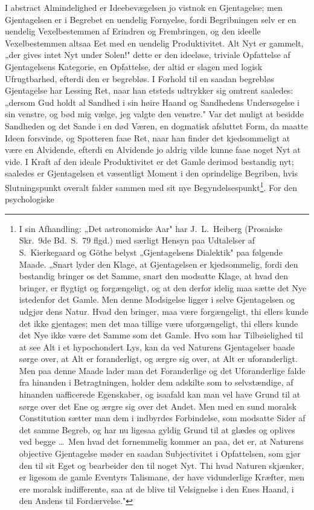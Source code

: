 \documentclass[12pt]{book}
\newcommand{\opage}[1]{\marginnote{\footnotesize\textit{[#1]}}}
\begin{document}
I abstract Almindelighed er Ideebevægelsen jo vistnok en Gjentagelse; men Gjentagelsen er i
Begrebet en uendelig Fornyelse, fordi Begribningen selv er en uendelig Vexelbestemmen af Erindren
og Frembringen, og den ideelle Vexelbestemmen altsaa Eet med en uendelig Produktivitet. Alt Nyt
er gammelt, „der gives intet Nyt under Solen!" dette er den ideeløse, triviale Opfattelse af
Gjentagelsens Kategorie, en Opfattelse, der altid er slagen med logisk Ufrugtbarhed, efterdi den
er begrebløs. I Forhold til en saadan begrebløs Gjentagelse har Lessing Ret, naar han etsteds
udtrykker sig omtrent saaledes: „dersom Gud holdt al Sandhed i sin høire Haand og Sandhedens
Undersøgelse i sin venstre, og bød mig vælge, jeg valgte den venstre." Var det muligt at besidde
Sandheden og det Sande i en død Væren, en dogmatisk afsluttet Form, da maatte Ideen forsvinde, og
Spotteren faae
\opage{192} Ret, naar han finder det kjedsommeligt at være en Alvidende, efterdi en Alvidende jo aldrig vilde
kunne faae noget Nyt at vide. I Kraft af den ideale Produktivitet er det Gamle derimod bestandig
nyt; saaledes er Gjentagelsen et væsentligt Moment i den oprindelige Begriben, hvis Slutningspunkt
overalt falder sammen med sit nye Begyndelsespunkt\footnote{I sin Afhandling: „Det astronomiske
Aar" har J.\ L.\ Heiberg (Prosaiske Skr.\ 9de Bd.\ S.~79 flgd.) med særligt Hensyn paa Udtalelser
af S.\ Kierkegaard og Göthe belyst „Gjentagelsens Dialektik" paa følgende Maade. „Snart lyder den
Klage, at Gjentagelsen er kjedsommelig, fordi den bestandig bringer os det Samme, snart den
modsatte Klage, at hvad den bringer, er flygtigt og forgængeligt, og at den derfor idelig maa
sætte det Nye istedenfor det Gamle. Men denne Modsigelse ligger i selve Gjentagelsen og udgjør
dens Natur. Hvad den bringer, maa være forgængeligt, thi ellers kunde det ikke gjentages; men det
maa tillige være uforgængeligt, thi ellers kunde det Nye ikke være det Samme som det Gamle. Hvo
som har Tilbøielighed til at see Alt i et hypochondert Lys, kan da ved Naturens Gjentagelser baade
sørge over, at Alt er foranderligt, og ærgre sig over, at Alt er uforanderligt. Men paa denne
Maade lader man det Foranderlige og det Uforanderlige falde fra hinanden i Betragtningen, holder
dem adskilte som to selvstændige, af hinanden uafficerede Egenskaber, og isaafald kan man vel have
Grund til at sørge over det Ene og ærgre sig over det Andet. Men med en sund moralsk Constitution
sætter man dem i indbyrdes Forbindelse, som modsatte Sider af det samme Begreb, og har nu ligesaa
gyldig Grund til at glædes og oplives ved begge \dots\ Men hvad det fornemmelig kommer an paa, det
er, at Naturens objective Gjentagelse møder en saadan Subjectivitet i Opfattelsen, som gjør den
til sit Eget og bearbeider den til noget Nyt. Thi hvad Naturen skjænker, er ligesom de gamle
Eventyrs Talismane, der have vidunderlige Kræfter, men ere moralsk indifferente, saa at de blive
til Velsignelse i den Enes Haand, i den Andens til Fordærvelse."}. For den psychologiske
\end{document}
